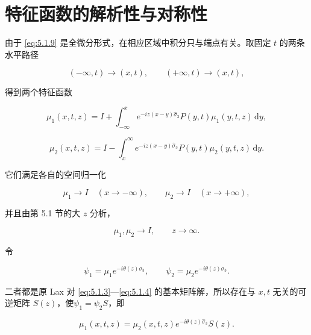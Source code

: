 \documentclass[
    lang=cn,
    scheme=chinese,
    mode=simple,
    device=normal,
    color=blue,
    math=cm,
    thmcnt=section,
    12pt,
    nowatermark
]{elegantbook}
\begin{document}
\section{特征函数的解析性与对称性}

由于 \eqref{eq:5.1.9} 是全微分形式，在相应区域中积分只与端点有关。取固定 $t$ 的两条水平路径

\[
    (-\infty,t)\to(x,t),
    \qquad
    (+\infty,t)\to(x,t),
\]

得到两个特征函数

\begin{equation}
    \mu_1(x,t,z)
    =
    I+
    \int_{-\infty}^{x}
    e^{-iz(x-y)\widehat{\sigma}_3}
    P(y,t)\mu_1(y,t,z)\,\mathrm dy,
    \tag{5.2.1}
    \label{eq:5.2.1}
\end{equation}

\begin{equation}
    \mu_2(x,t,z)
    =
    I-
    \int_x^{\infty}
    e^{-iz(x-y)\widehat{\sigma}_3}
    P(y,t)\mu_2(y,t,z)\,\mathrm dy.
    \tag{5.2.2}
    \label{eq:5.2.2}
\end{equation}

它们满足各自的空间归一化

\[
    \mu_1\to I\quad(x\to-\infty),
    \qquad
    \mu_2\to I\quad(x\to+\infty),
\]

并且由第 5.1 节的大 $z$ 分析，

\[
    \mu_1,\mu_2\to I,\qquad z\to\infty.
\]


令

\[
    \psi_1=\mu_1e^{-i\theta(z)\sigma_3},
    \qquad
    \psi_2=\mu_2e^{-i\theta(z)\sigma_3}.
\]

二者都是原 Lax 对 \eqref{eq:5.1.3}---\eqref{eq:5.1.4} 的基本矩阵解，所以存在与 $x,t$ 无关的可逆矩阵 $S(z)$，使$\psi_1=\psi_2S$，即

\begin{equation}
    \mu_1(x,t,z)
    =
    \mu_2(x,t,z)e^{-i\theta(z)\widehat{\sigma}_3}S(z).
    \tag{5.2.3}
    \label{eq:5.2.3}
\end{equation}
\end{document}
